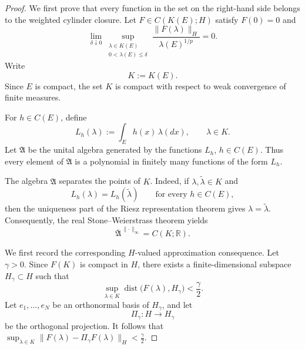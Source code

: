 \documentclass[10pt,a4paper]{amsart}
\begin{document}
\begin{proof}
We first prove that every function in the set on the right-hand side
belongs to the weighted cylinder closure. Let
$
        F\in C(K(E);H)
$
satisfy \(F(0)=0\) and
\[
\lim_{\delta\downarrow0}
\sup_{\substack{\lambda\in K(E)\\
                 0<\lambda(E)\le\delta}}
\frac{\lVert F(\lambda)\rVert_H}
     {\lambda(E)^{1/p}}
=
0.
\]
Write
\[
        K:=K(E).
\]
Since \(E\) is compact, the set \(K\) is compact with respect to weak
convergence of finite measures.

For \(h\in C(E)\), define
\[
        L_h(\lambda)
        :=
        \int_E h(x)\,\lambda(dx),
        \qquad \lambda\in K.
\]
Let \(\mathfrak A\) be the unital algebra generated by the functions
\(L_h\), \(h\in C(E)\). Thus every element of \(\mathfrak A\) is a
polynomial in finitely many functions of the form \(L_h\).

The algebra \(\mathfrak A\) separates the points of \(K\). Indeed, if
\(\lambda,\widetilde\lambda\in K\) and
\[
        L_h(\lambda)=L_h(\widetilde\lambda)
        \qquad\text{for every }h\in C(E),
\]
then the uniqueness part of the Riesz representation theorem gives
$
        \lambda=\widetilde\lambda.
$
Consequently, the real Stone--Weierstrass theorem yields
\[
        \overline{\mathfrak A}^{\,\lVert\cdot\rVert_\infty}
        =
        C(K;\mathbb R).
\]

We first record the corresponding \(H\)-valued approximation
consequence. Let \(\gamma>0\). Since \(F(K)\) is compact in \(H\), there
exists a finite-dimensional subspace \(H_\gamma\subset H\) such that
\[
        \sup_{\lambda\in K}
        \operatorname{dist}
        \bigl(F(\lambda),H_\gamma\bigr)
        <
        \frac{\gamma}{2}.
\]
Let
$
        e_1,\ldots,e_N
$
be an orthonormal basis of \(H_\gamma\), and let
\[
        \Pi_\gamma:H\longrightarrow H_\gamma
\]
be the orthogonal projection. It follows that
$
        \sup_{\lambda\in K}
        \lVert F(\lambda)-\Pi_\gamma F(\lambda)\rVert_H
        <
        \frac{\gamma}{2}.
$


\end{proof}
\end{document}
